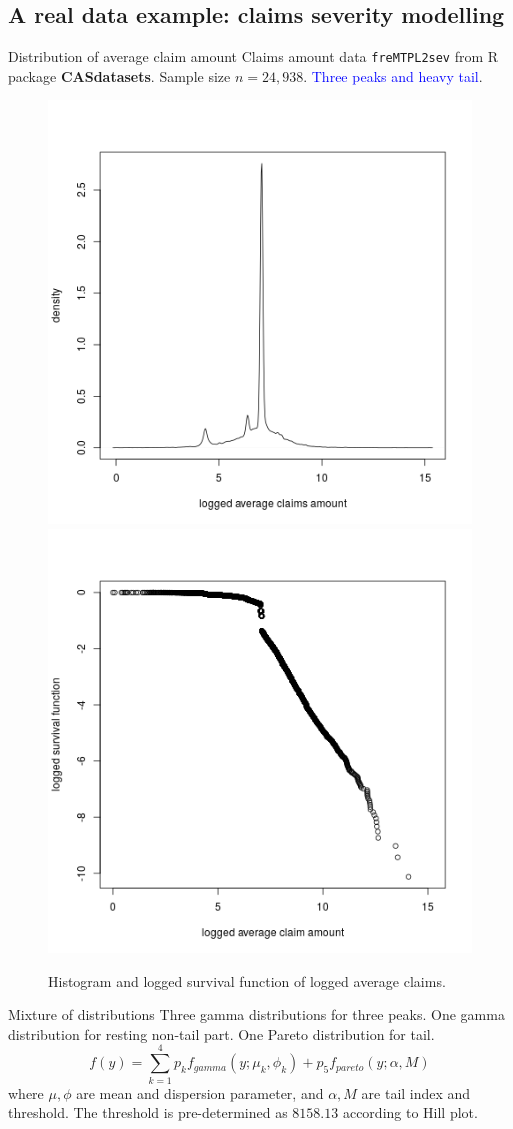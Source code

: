 \documentclass[11pt]{article}
\numberwithin{equation}{section}
\newcommand{\blue}[1]{\textcolor{blue}{#1}}
\begin{document}
\subsection{A real data example: claims severity modelling}
		
\begin{frame}{Distribution of average claim amount}
	Claims amount data {\tt freMTPL2sev} from R package {\bf CASdatasets}. Sample size $n=24,938$. \blue{Three peaks and heavy tail}.
	\begin{figure}[h!]
		\centering
		\includegraphics[width=0.35\linewidth]{../plots/sev/hist.png}
		\includegraphics[width=0.35\linewidth]{../plots/sev/log-log.png}
		\caption{Histogram and logged survival function of logged average claims.}\label{tail}
	\end{figure}
\end{frame}

\begin{frame}{Mixture of distributions}
	Three gamma distributions for three peaks. One gamma distribution for resting non-tail part. One Pareto distribution for tail.
	$$f(y)=\sum_{k=1}^4p_kf_{gamma}(y;\mu_k,\phi_k)+p_5f_{pareto}(y;\alpha,M)$$
	where $\mu,\phi$ are mean and dispersion parameter, and $\alpha, M$ are tail index and threshold. The threshold is pre-determined as $8158.13$ according to Hill plot.
\end{frame}
\end{document}
